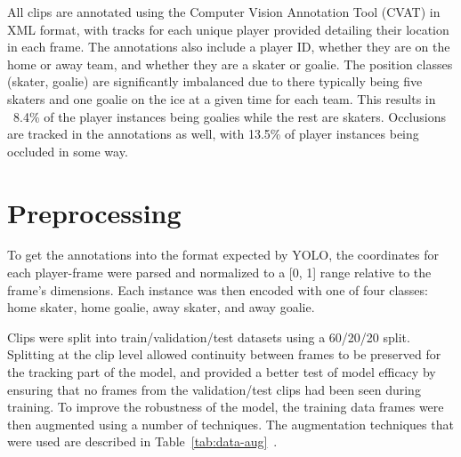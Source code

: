 \documentclass[12pt,stu,donotrepeattitle,floatsintext]{apa7}
\newcommand{\customsection}[2]{
  \phantomsection
  \section*{#1}\label{#2}
  \addcontentsline{toc}{section}{#1}
}
\begin{document}
    All clips are annotated using the Computer Vision Annotation Tool (CVAT) in XML format, with tracks for each unique player provided detailing their location in each frame.
    The annotations also include a player ID, whether they are on the home or away team, and whether they are a skater or goalie.
    The position classes (skater, goalie) are significantly imbalanced due to there typically being five skaters and one goalie on the ice at a given time for each team.
    This results in ~8.4\% of the player instances being goalies while the rest are skaters.
    Occlusions are tracked in the annotations as well, with 13.5\% of player instances being occluded in some way.

    \customsection{Preprocessing}{preprocessing}

    To get the annotations into the format expected by YOLO, the coordinates for each player-frame were parsed and normalized to a [0, 1] range relative to the frame's dimensions.
    Each instance was then encoded with one of four classes: home skater, home goalie, away skater, and away goalie.

    Clips were split into train/validation/test datasets using a 60/20/20 split.
    Splitting at the clip level allowed continuity between frames to be preserved for the tracking part of the model, and provided a better test of model efficacy by ensuring that no frames from the validation/test clips had been seen during training.
    To improve the robustness of the model, the training data frames were then augmented using a number of techniques.
    The augmentation techniques that were used are described in Table~\ref{tab:data-aug}~\parencite{yolo_train_docs}.
\end{document}
